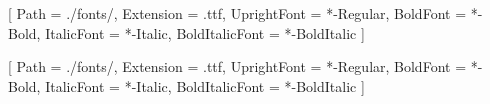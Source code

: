 %

[
    Path = ./fonts/,
    Extension = .ttf,
    UprightFont = *-Regular,
    BoldFont = *-Bold,
    ItalicFont = *-Italic,
    BoldItalicFont = *-BoldItalic
]

\setsansfont{BardSans}[
    Path = ./fonts/,
    Extension = .ttf,
    UprightFont = *-Regular,
    BoldFont = *-Bold,
    ItalicFont = *-Italic,
    BoldItalicFont = *-BoldItalic
]
